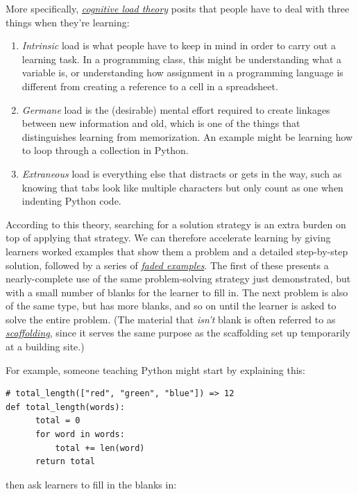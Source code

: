 \documentclass[10pt,statementpaper]{memoir}
\begin{document}
More specifically,
\emph{\href{gloss.html\#cognitive-load-theory}{cognitive load theory}}
posits that people have to deal with three things when they're learning:

\begin{enumerate}
\def\labelenumi{\arabic{enumi}.}
\item
  \emph{Intrinsic} load is what people have to keep in mind in order to
  carry out a learning task. In a programming class, this might be
  understanding what a variable is, or understanding how assignment in a
  programming language is different from creating a reference to a cell
  in a spreadsheet.
\item
  \emph{Germane} load is the (desirable) mental effort required to
  create linkages between new information and old, which is one of the
  things that distinguishes learning from memorization. An example might
  be learning how to loop through a collection in Python.
\item
  \emph{Extraneous} load is everything else that distracts or gets in
  the way, such as knowing that tabs look like multiple characters but
  only count as one when indenting Python code.
\end{enumerate}

According to this theory, searching for a solution strategy is an extra
burden on top of applying that strategy. We can therefore accelerate
learning by giving learners worked examples that show them a problem and
a detailed step-by-step solution, followed by a series of
\emph{\href{gloss.html\#faded-example}{faded examples}}. The first of
these presents a nearly-complete use of the same problem-solving
strategy just demonstrated, but with a small number of blanks for the
learner to fill in. The next problem is also of the same type, but has
more blanks, and so on until the learner is asked to solve the entire
problem. (The material that \emph{isn't} blank is often referred to as
\emph{\href{gloss.html\#scaffolding}{scaffolding}}, since it serves the
same purpose as the scaffolding set up temporarily at a building site.)

For example, someone teaching Python might start by explaining this:

\begin{verbatim}
# total_length(["red", "green", "blue"]) => 12
def total_length(words):
      total = 0
      for word in words:
          total += len(word)
      return total
\end{verbatim}

\noindent
then ask learners to fill in the blanks in:
\end{document}
